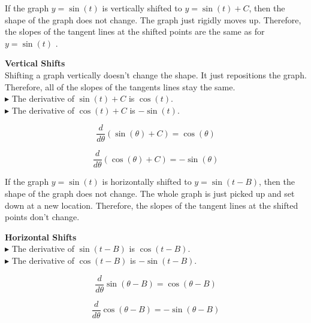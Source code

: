 \documentclass{ximera}
\begin{document}
If the graph $y = \sin(t)$ is vertically shifted to $y = \sin(t)+C$, then the shape of the graph does not change. The graph just rigidly moves up. Therefore, the slopes of the tangent lines at the shifted points are the same as for $y = \sin(t)$ .



\begin{observation} \textbf{\textcolor{purple!85!blue}{Vertical Shifts}}  \\

Shifting a graph vertically doesn't change the shape.  It just repositions the graph.  Therefore, all of the slopes of the tangents lines stay the same. \\



$\blacktriangleright$ The derivative of $\sin(t)+C$ is $\cos(t)$. \\

$\blacktriangleright$ The derivative of $\cos(t)+C$ is $-\sin(t)$. \\

\end{observation}


\begin{notation}

\[
\frac{d}{d\theta} (\sin(\theta) + C) = \cos(\theta)
\]

\[
\frac{d}{d\theta} (\cos(\theta) + C) = -\sin(\theta)
\]

\end{notation}


If the graph $y = \sin(t)$ is horizontally shifted to $y = \sin(t - B)$, then the shape of the graph does not change. The whole graph is just picked up and set down at a new location. Therefore, the slopes of the tangent lines at the shifted points don't change.



\begin{observation} \textbf{\textcolor{purple!85!blue}{Horizontal Shifts}} \\

$\blacktriangleright$ The derivative of $\sin(t - B)$ is $\cos(t - B)$. \\

$\blacktriangleright$ The derivative of $\cos(t - B)$ is $-\sin(t - B)$. \\

\end{observation}


\begin{notation}

\[
\frac{d}{d\theta} \sin(\theta - B) = \cos(\theta - B)
\]

\[
\frac{d}{d\theta} \cos(\theta - B) = -\sin(\theta - B)
\]

\end{notation}
\end{document}
